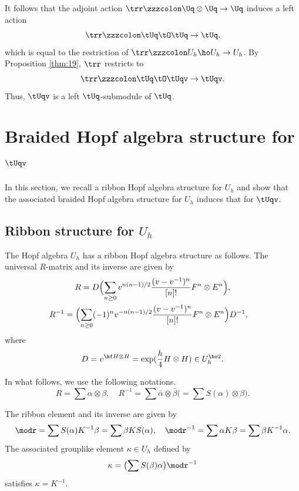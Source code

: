 \documentclass{amsart}
\numberwithin{equation}{section}
\numberwithin{figure}{section}
\theoremstyle{plain}
\theoremstyle{definition}
\theoremstyle{remark}
\begin{document}
It follows that the adjoint action $\trr\zzzcolon \Uq\otimes \Uq\rightarrow \Uq$ induces a
left action
\begin{equation*}
  \trr \zzzcolon  \tUq\tO\tUq \rightarrow \tUq,
\end{equation*}
which is equal to the restriction of $\trr\zzzcolon U_h\ho U_h\rightarrow U_h$.  By
Proposition \ref{thm:19}, $\trr$ restricts to
\begin{gather*}
  \trr \zzzcolon  \tUq\tO\tUqv \rightarrow \tUqv.
\end{gather*}
Thus, $\tUqv$ is a left $\tUq$-submodule of $\tUq$.

\section{Braided Hopf algebra structure for $\tUqv$}
\label{sec3}

In this section, we recall a ribbon Hopf algebra structure for $U_h$
and show that the associated braided Hopf algebra structure for $U_h$
induces that for $\tUqv$.

\subsection{Ribbon structure for $U_h$}
\label{sec:ribbon-structure-uh}
The Hopf algebra $U_h$ has a ribbon Hopf algebra structure as follows.
 The universal $R$-matrix and its inverse are given by
\begin{gather}
  R = D\Bigl(\sum_{n\ge 0} v^{n(n-1)/2}
  \frac{(v-v^{-1})^n}{[n]!} F^n\otimes E^n\Bigr),\\
  \begin{split}
  R^{-1}
  &= \Bigl(\sum_{n\ge 0} (-1)^n v^{-n(n-1)/2}
  \frac{(v-v^{-1})^n}{[n]!}  F^n\otimes E^n\Bigr)D^{-1},
  \end{split}
\end{gather}
where
\begin{equation*}
  D=v^{\hf H\otimes H}=\exp (\frac h4 H\otimes H)\in U_h^{\ho2}.
\end{equation*}

In what follows, we use the following notations.
\begin{equation*}
  R=\sum\alpha \otimes \beta ,\quad R^{-1}=\sum\bar\alpha \otimes \bar\beta 
  \bigl(=\sum S(\alpha )\otimes \beta \bigr).
\end{equation*}

The ribbon element and its inverse are given by
\begin{gather*}
  \modr  = \sum S(\alpha )K^{-1}\beta =\sum\beta KS(\alpha ),\quad
  \modr ^{-1} = \sum \alpha K\beta =\sum\beta K^{-1}\alpha .
\end{gather*}
The associated grouplike element $\kappa \in U_h$ defined by
\begin{equation*}
  \kappa =\bigl(\sum S(\beta )\alpha \bigr)\modr ^{-1}
\end{equation*}
satisfies $\kappa =K^{-1}$.
\end{document}

